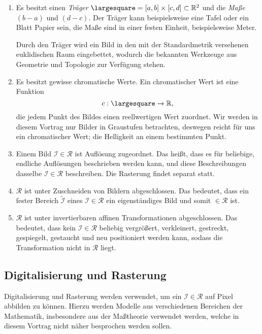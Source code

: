 \documentclass[afourpaper]{tufte-handout}
\begin{document}
\begin{enumerate}
  \item Es besitzt einen \emph{Träger} \( \largesquare = [a,b] \times [c,d] \subset \R^2 \) und die \emph{Maße} \( (b-a) \) und \( (d-c) \). Der Träger kann beispielsweise eine Tafel oder ein Blatt Papier sein, die Maße sind in einer festen Einheit, beispielsweise Meter.

  Durch den Träger wird ein Bild in den mit der Standardmetrik versehenen euklidischen Raum eingebettet, wodurch die bekannten Werkzeuge aus Geometrie und Topologie zur Verfügung stehen.

  \item Es besitzt gewisse chromatische Werte. Ein chromatischer Wert ist eine Funktion
  \begin{equation*}
    c: \largesquare \to \R\text{,}
  \end{equation*}
  die jedem Punkt des Bildes einen reellwertigen Wert zuordnet. Wir werden in diesem Vortrag nur Bilder in Graustufen betrachten, deswegen reicht für uns ein chromatischer Wert; die Helligkeit an einem bestimmten Punkt.

  \item Einem Bild \( \mathcal{I} \in \mathcal{R} \) ist  Auflösung zugeordnet. Das heißt, dass es für beliebige, endliche Auflösungen beschrieben werden kann, und diese Beschreibungen dasselbe \( \mathcal{I} \in \mathcal{R} \) beschreiben. Die Rasterung findet separat statt.

  \item \( \mathcal{R} \) ist unter Zuschneiden von Bildern abgeschlossen. Das bedeutet, dass ein fester Bereich \( \widetilde{\mathcal{I}} \) eines \( \mathcal{I} \in \mathcal{R} \) ein eigenständiges Bild und somit \( \in \mathcal{R} \) ist.

  \item \( \mathcal{R} \) ist unter invertierbaren affinen Transformationen abgeschlossen. Das bedeutet, dass kein \( \mathcal{I} \in \mathcal{R} \) beliebig vergrößert, verkleinert, gestreckt, gespiegelt, gestaucht und neu positioniert werden kann, sodass die Transformation nicht in \( \mathcal{R} \) liegt.
\end{enumerate}

\subsection{Digitalisierung und Rasterung}

Digitalisierung und Rasterung werden verwendet, um ein \( \mathcal{I} \in \mathcal{R} \) auf Pixel abbilden zu können. Hierzu werden Modelle aus verschiedenen Bereichen der Mathematik, insbesondere aus der Maßtheorie verwendet werden, welche in diesem Vortrag nicht näher besprochen werden sollen.
\end{document}
